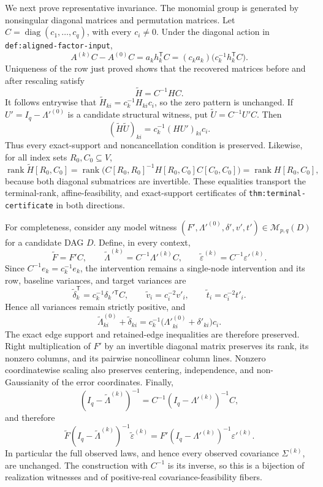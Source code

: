 We next prove representative invariance.  The monomial group is generated by
nonsingular diagonal matrices and permutation matrices.  Let
\(C=\operatorname{diag}(c_1,\ldots,c_q)\), with every \(c_i\ne0\).  Under the
diagonal action in \texttt{def:aligned-factor-input},
\[
 A^{(k)}C-A^{(0)}C
 =a_kh_k^{\mathsf T}C
 =(c_ka_k)\bigl(c_k^{-1}h_k^{\mathsf T}C\bigr).
\]
Uniqueness of the row just proved shows that the recovered matrices before and
after rescaling satisfy
\[
 \widetilde H=C^{-1}HC.
\]
It follows entrywise that \(\widetilde H_{ki}=c_k^{-1}H_{ki}c_i\), so the zero
pattern is unchanged.  If \(U'=I_q-\Lambda'^{(0)}\) is a candidate structural
witness, put \(\widetilde U=C^{-1}U'C\).  Then
\[
 (\widetilde H\widetilde U)_{ki}
 =c_k^{-1}(HU')_{ki}c_i.
\]
Thus every exact-support and noncancellation condition is preserved.  Likewise,
for all index sets \(R_0,C_0\subseteq V\),
\[
 \operatorname{rank}\widetilde H[R_0,C_0]
 =\operatorname{rank}\bigl(C[R_0,R_0]^{-1}H[R_0,C_0]C[C_0,C_0]\bigr)
 =\operatorname{rank}H[R_0,C_0],
\]
because both diagonal submatrices are invertible.  These equalities transport the
terminal-rank, affine-feasibility, and exact-support certificates of
\texttt{thm:terminal-certificate} in both directions.

For completeness, consider any model witness
\((F',\Lambda'^{(0)},\delta',v',t')\in\mathcal M_{p,q}(D)\) for a candidate DAG
\(D\).  Define, in every context,
\[
 \widetilde F=F'C,
 \qquad
 \widetilde\Lambda^{(k)}=C^{-1}\Lambda'^{(k)}C,
 \qquad
 \widetilde\varepsilon^{(k)}=C^{-1}\varepsilon'^{(k)}.
\]
Since \(C^{-1}e_k=c_k^{-1}e_k\), the intervention remains a single-node
intervention and its row, baseline variances, and target variances are
\[
 \widetilde\delta_k^{\mathsf T}=c_k^{-1}\delta_k'{}^{\mathsf T}C,
 \qquad
 \widetilde v_i=c_i^{-2}v'_i,
 \qquad
 \widetilde t_i=c_i^{-2}t'_i.
\]
Hence all variances remain strictly positive, and
\[
 \widetilde\Lambda^{(0)}_{ki}+\widetilde\delta_{ki}
 =c_k^{-1}\bigl(\Lambda'^{(0)}_{ki}+\delta'_{ki}\bigr)c_i.
\]
The exact edge support and retained-edge inequalities are therefore preserved.
Right multiplication of \(F'\) by an invertible diagonal matrix preserves its
rank, its nonzero columns, and its pairwise noncollinear column lines.  Nonzero
coordinatewise scaling also preserves centering, independence, and
non-Gaussianity of the error coordinates.  Finally,
\[
 (I_q-\widetilde\Lambda^{(k)})^{-1}
 =C^{-1}(I_q-\Lambda'^{(k)})^{-1}C,
\]
and therefore
\[
 \widetilde F(I_q-\widetilde\Lambda^{(k)})^{-1}
 \widetilde\varepsilon^{(k)}
 =F'(I_q-\Lambda'^{(k)})^{-1}\varepsilon'^{(k)}.
\]
In particular the full observed laws, and hence every observed covariance
\(\Sigma^{(k)}\), are unchanged.  The construction with \(C^{-1}\) is its
inverse, so this is a bijection of realization witnesses and of positive-real
covariance-feasibility fibers.

